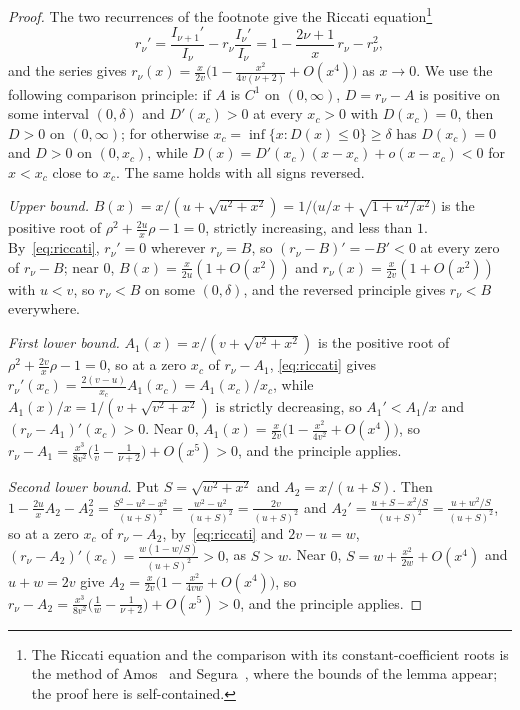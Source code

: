 \begin{proof}
The two recurrences of the footnote give the Riccati equation\footnote{The
Riccati equation and the comparison with its constant-coefficient roots is the
method of Amos~\cite{Amo74} and Segura~\cite{Seg11}, where the bounds of the
lemma appear; the proof here is self-contained.}
\begin{equation}\label{eq:riccati}
r_\nu'=\frac{I_{\nu+1}'}{I_\nu}-r_\nu\frac{I_\nu'}{I_\nu}
=1-\frac{2\nu+1}{x}\,r_\nu-r_\nu^2,
\end{equation}
and the series gives $r_\nu(x)=\frac{x}{2v}\bigl(1-\frac{x^2}{4v(\nu+2)}+
O(x^4)\bigr)$ as $x\to0$. We use the following comparison principle: if $A$
is $C^1$ on $(0,\infty)$, $D=r_\nu-A$ is positive on some interval $(0,\delta)$
and $D'(x_c)>0$ at every $x_c>0$ with $D(x_c)=0$, then $D>0$ on $(0,\infty)$;
for otherwise $x_c=\inf\{x:D(x)\le0\}\ge\delta$ has $D(x_c)=0$ and $D>0$ on
$(0,x_c)$, while $D(x)=D'(x_c)(x-x_c)+o(x-x_c)<0$ for $x<x_c$ close to $x_c$.
The same holds with all signs reversed.

\emph{Upper bound.} $B(x)=x/(u+\sqrt{u^2+x^2})=1/\bigl(u/x+\sqrt{1+u^2/x^2}
\bigr)$ is the positive root of $\rho^2+\frac{2u}x\rho-1=0$, strictly
increasing, and less than $1$. By~\eqref{eq:riccati}, $r_\nu'=0$ wherever
$r_\nu=B$, so $(r_\nu-B)'=-B'<0$ at every zero of $r_\nu-B$; near $0$,
$B(x)=\frac x{2u}(1+O(x^2))$ and $r_\nu(x)=\frac x{2v}(1+O(x^2))$ with $u<v$,
so $r_\nu<B$ on some $(0,\delta)$, and the reversed principle gives $r_\nu<B$
everywhere.

\emph{First lower bound.} $A_1(x)=x/(v+\sqrt{v^2+x^2})$ is the positive root
of $\rho^2+\frac{2v}x\rho-1=0$, so at a zero $x_c$ of $r_\nu-A_1$,
\eqref{eq:riccati} gives $r_\nu'(x_c)=\frac{2(v-u)}{x_c}A_1(x_c)=
A_1(x_c)/x_c$, while $A_1(x)/x=1/(v+\sqrt{v^2+x^2})$ is strictly decreasing,
so $A_1'<A_1/x$ and $(r_\nu-A_1)'(x_c)>0$. Near $0$, $A_1(x)=\frac x{2v}\bigl(
1-\frac{x^2}{4v^2}+O(x^4)\bigr)$, so $r_\nu-A_1=\frac{x^3}{8v^2}\bigl(\frac1v-
\frac1{\nu+2}\bigr)+O(x^5)>0$, and the principle applies.

\emph{Second lower bound.} Put $S=\sqrt{w^2+x^2}$ and $A_2=x/(u+S)$. Then
$1-\frac{2u}xA_2-A_2^2=\frac{S^2-u^2-x^2}{(u+S)^2}=\frac{w^2-u^2}{(u+S)^2}=
\frac{2v}{(u+S)^2}$ and $A_2'=\frac{u+S-x^2/S}{(u+S)^2}=\frac{u+w^2/S}{(u+S)^2}$,
so at a zero $x_c$ of $r_\nu-A_2$, by~\eqref{eq:riccati} and $2v-u=w$,
$(r_\nu-A_2)'(x_c)=\frac{w(1-w/S)}{(u+S)^2}>0$, as $S>w$. Near $0$, $S=w+
\frac{x^2}{2w}+O(x^4)$ and $u+w=2v$ give $A_2=\frac x{2v}\bigl(1-\frac{x^2}
{4vw}+O(x^4)\bigr)$, so $r_\nu-A_2=\frac{x^3}{8v^2}\bigl(\frac1w-\frac1{\nu+2}
\bigr)+O(x^5)>0$, and the principle applies.


\end{proof}
